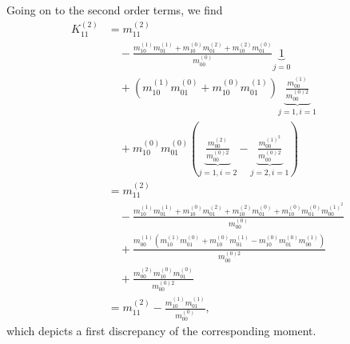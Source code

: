 Going on to the second order terms, we find
\begin{equation}
  \begin{aligned}
    K_{11}^{(2)}
    &= m_{11}^{(2)} \\
    &\quad-
    \frac{
      m_{10}^{(1)}m_{01}^{(1)}
    + m_{10}^{(0)}m_{01}^{(2)}
    + m_{10}^{(2)}m_{01}^{(0)}
    }{m_{00}^{(0)}}\underbrace{1}_{j=0}\\
    &\quad
    +(m_{10}^{(1)}m_{01}^{(0)} + m_{10}^{(0)}m_{01}^{(1)})\underbrace{ \frac{m_{00}^{(1)}}{m_{00}^{(0)2}}}_{j=1,i=1}\\
    &\quad
    + m_{10}^{(0)}m_{01}^{(0)}
    \left(
      \underbrace{\frac{m_{00}^{(2)}}{{m_{00}^{(0)2}}}}_{j=1,i=2}
      - \underbrace{\frac{m_{00}^{{(1)}^2}}{m_{00}^{(0)2}}}_{j=2,i=1}
    \right)\\
    &= m_{11}^{(2)} \\
    &\quad-
    \frac{
      m_{10}^{(1)}m_{01}^{(1)}
    + m_{10}^{(0)}m_{01}^{(2)}
    + m_{10}^{(2)}m_{01}^{(0)}
    + m_{10}^{(0)}m_{01}^{(0)}m_{00}^{{(1)}^2}
    }{m_{00}^{(0)}}\\
    &\quad
    + \frac{m_{00}^{(1)}(m_{10}^{(1)}m_{01}^{(0)} + m_{10}^{(0)}m_{01}^{(1)} - m_{10}^{(0)}m_{01}^{(0)}m_{00}^{(1)})}{m_{00}^{(0)2}}  \\
    &\quad
    + \frac{m_{00}^{(2)}m_{10}^{(0)}m_{01}^{(0)}}{m_{00}^{(0)2}} \\
    & = m_{11}^{(2)}
    - \frac{ m_{10}^{(1)}m_{01}^{(1)}}{m_{00}^{(0)}},
  \end{aligned}
\end{equation}
which depicts a first discrepancy of the corresponding moment.

